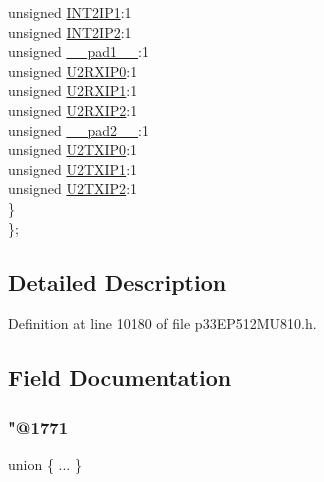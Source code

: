 \begin{DoxyCompactItemize}
\begin{tabbing}
\>\>unsigned \hyperlink{structtag_i_p_c7_b_i_t_s_a9d216a40e3bcd8e1ffe0685a86c96509}{INT2IP1}:1\\
\>\>unsigned \hyperlink{structtag_i_p_c7_b_i_t_s_aeb589e334f051fad61b407f18f164dc7}{INT2IP2}:1\\
\>\>unsigned \hyperlink{structtag_i_p_c7_b_i_t_s_acaf2d0924a107ec6e8d2e31febaf66f9}{\_\_pad1\_\_}:1\\
\>\>unsigned \hyperlink{structtag_i_p_c7_b_i_t_s_a4c681a59fdeba707fcaaa53d89e62d91}{U2RXIP0}:1\\
\>\>unsigned \hyperlink{structtag_i_p_c7_b_i_t_s_a36c7223f79d5c43e78f85daef9b3a4b1}{U2RXIP1}:1\\
\>\>unsigned \hyperlink{structtag_i_p_c7_b_i_t_s_ad909ce727b002f359272693c12821c9e}{U2RXIP2}:1\\
\>\>unsigned \hyperlink{structtag_i_p_c7_b_i_t_s_a4d97cc5f7d51d22fc2bf3eab35c9cb7f}{\_\_pad2\_\_}:1\\
\>\>unsigned \hyperlink{structtag_i_p_c7_b_i_t_s_a8dfd89c868afa2657ee96251d3110ca5}{U2TXIP0}:1\\
\>\>unsigned \hyperlink{structtag_i_p_c7_b_i_t_s_a4a7afb5421798b63331b934f4cdfecbf}{U2TXIP1}:1\\
\>\>unsigned \hyperlink{structtag_i_p_c7_b_i_t_s_af422feb5bf33772e0ad81b5f1c6b272a}{U2TXIP2}:1\\
\>\} \\
\}; \\

\end{tabbing}\end{DoxyCompactItemize}


\subsection{Detailed Description}


Definition at line 10180 of file p33\+E\+P512\+M\+U810.\+h.



\subsection{Field Documentation}
\mbox{\label{structtag_i_p_c7_b_i_t_s_a51ede1b00b6891231f650410dfb2b79c}} 
\subsubsection{\texorpdfstring{"@1771}{@1771}}
{\footnotesize\ttfamily union \{ ... \} }

